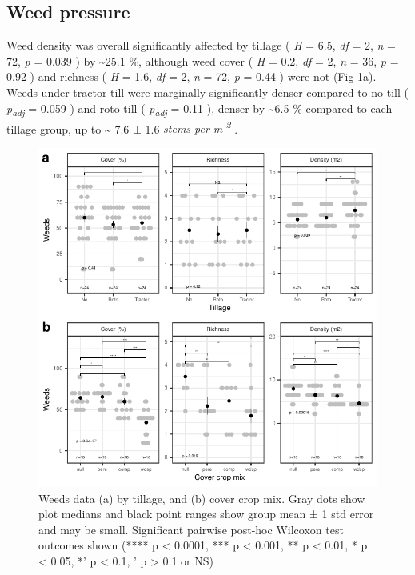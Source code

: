 \documentclass[
  12pt,
]{article}
\begin{document}
\hypertarget{weed-pressure}{%
\subsection{Weed pressure}\label{weed-pressure}}

Weed density was overall significantly affected by tillage (
\emph{H} = 6.5,
\emph{df} = 2,
\emph{n} = 72,
\emph{p} = 0.039
) by
\textasciitilde25.1 \%,
although weed cover (
\emph{H} = 0.2,
\emph{df} = 2,
\emph{n} = 36,
\emph{p} = 0.92
) and richness (
\emph{H} = 1.6,
\emph{df} = 2,
\emph{n} = 72,
\emph{p} = 0.44
) were not
(Fig \ref{fig:weedsFig}a).
Weeds under tractor-till were marginally significantly denser compared to no-till (
\emph{p\textsubscript{adj}} = 0.059
) and roto-till (
\emph{p\textsubscript{adj}} = 0.11
), denser by
\textasciitilde6.5 \%
compared to each tillage group,
up to
\textasciitilde{} 7.6 ±
1.6 \emph{stems per m\textsuperscript{-2}}
.

\begin{figure}
\centering
\includegraphics{merge_files/figure-latex/weedsFig-1.pdf}
\caption{\label{fig:weedsFig}Weeds data (a) by tillage, and (b) cover crop mix. Gray dots show plot medians and black point ranges show group mean ± 1 std error and may be small. Significant pairwise post-hoc Wilcoxon test outcomes shown (**** p \textless{} 0.0001, *** p \textless{} 0.001, ** p \textless{} 0.01, * p \textless{} 0.05, *' p \textless{} 0.1, ' p \textgreater{} 0.1 or NS)}
\end{figure}
\end{document}
